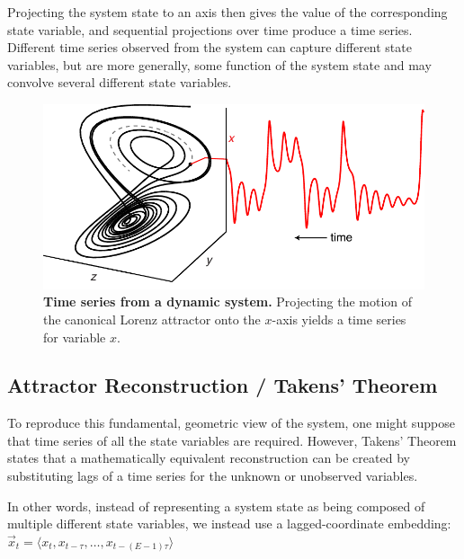 Projecting the system state to an axis then gives the value of the corresponding state variable, and sequential projections over time produce a time series. Different time series observed from the system can capture different state variables, but are more generally, some function of the system state and may convolve several different state variables.

\begin{figure}[!ht]
\begin{center}\includegraphics[width=\maxwidth{\textwidth}]{fig_redm_1.pdf}\end{center}
\caption[Time series from a dynamic system.]{\textbf{Time series from a dynamic system.}\newline
Projecting the motion of the canonical Lorenz attractor onto the $x$-axis yields a time series for variable $x$.}
\label{fig_redm_1}
\end{figure}

\subsection{Attractor Reconstruction / Takens' Theorem}

To reproduce this fundamental, geometric view of the system, one might suppose that time series of all the state variables are required. However, Takens' Theorem \cite{Takens_1981} states that a mathematically equivalent reconstruction can be created by substituting lags of a time series for the unknown or unobserved variables.

In other words, instead of representing a system state as being composed of multiple different state variables, we instead use a lagged-coordinate embedding:
$ \vec{x}_t = \langle x_t, x_{t-\tau}, \dots, x_{t-(E-1)\tau} \rangle $

